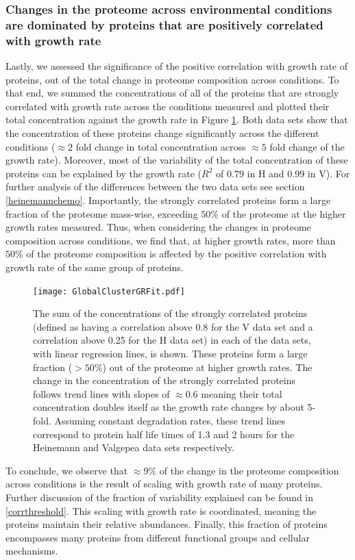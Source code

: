 \documentclass[notitlepage]{article}
\begin{document}
\subsubsection{Changes in the proteome across environmental conditions are dominated by proteins that are positively correlated with growth rate}
Lastly, we assessed the significance of the positive correlation with growth rate of proteins, out of the total change in proteome composition across conditions.
To that end, we summed the concentrations of all of the proteins that are strongly correlated with growth rate across the conditions measured and plotted their total concentration against the growth rate in Figure \ref{fig:globalgrcorr}.
Both data sets show that the concentration of these proteins change significantly across the different conditions ($\approx 2$ fold change in total concentration across $\approx 5$ fold change of the growth rate).
Moreover, most of the variability of the total concentration of these proteins can be explained by the growth rate ($R^2$ of $0.79$ in H and $0.99$ in V). 
For further analysis of the differences between the two data sets see section \ref{heinemannchemo}.
Importantly, the strongly correlated proteins form a large fraction of the proteome mass-wise, exceeding $50\%$ of the proteome at the higher growth rates measured.
Thus, when considering the changes in proteome composition across conditions, we find that, at higher growth rates, more than $50\%$ of the proteome composition is affected by the positive correlation with growth rate of the same group of proteins.

\begin{figure}[h]
\centering
\texttt{[image: GlobalClusterGRFit.pdf]}
\caption{
The sum of the concentrations of the strongly correlated proteins (defined as having a correlation above 0.8 for the V data set and a correlation above 0.25 for the H data set) in each of the data sets, with linear regression lines, is shown.
These proteins form a large fraction ($>50\%$) out of the proteome at higher growth rates.
The change in the concentration of the strongly correlated proteins follows trend lines with slopes of $\approx 0.6$ meaning their total concentration doubles itself as the growth rate changes by about 5-fold.
Assuming constant degradation rates, these trend lines correspond to protein half life times of 1.3 and 2 hours for the Heinemann and Valgepea data sets respectively.
}
\label{fig:globalgrcorr}
\end{figure}

To conclude, we observe that $\approx 9\%$ of the change in the proteome composition across conditions is the result of scaling with growth rate of many proteins.
Further discussion of the fraction of variability explained can be found in \ref{corrthreshold}.
This scaling with growth rate is coordinated, meaning the proteins maintain their relative abundances.
Finally, this fraction of proteins encompasses many proteins from different functional groups and cellular mechanisms.
\end{document}
